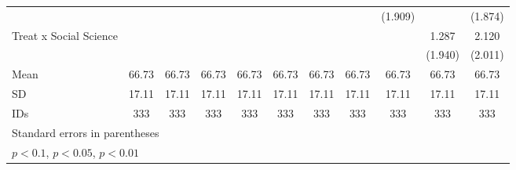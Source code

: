 \begin{table}[htbp]
\begin{tabular}{l*{10}{c}}
                                &                  &                  &                  &                  &                  &                  &                  &  (1.909)         &                  &  (1.874)         \\
Treat x Social Science          &                  &                  &                  &                  &                  &                  &                  &                  &    1.287         &    2.120         \\
                                &                  &                  &                  &                  &                  &                  &                  &                  &  (1.940)         &  (2.011)         \\
\hline
Mean                            &    66.73         &    66.73         &    66.73         &    66.73         &    66.73         &    66.73         &    66.73         &    66.73         &    66.73         &    66.73         \\
SD                              &    17.11         &    17.11         &    17.11         &    17.11         &    17.11         &    17.11         &    17.11         &    17.11         &    17.11         &    17.11         \\
IDs                             &      333         &      333         &      333         &      333         &      333         &      333         &      333         &      333         &      333         &      333         \\
\hline\hline
\multicolumn{11}{l}{\footnotesize Standard errors in parentheses}\\
\multicolumn{11}{l}{\footnotesize \sym{*} \(p<0.1\), \sym{**} \(p<0.05\), \sym{***} \(p<0.01\)}\\
\end{tabular}
\end{table}
